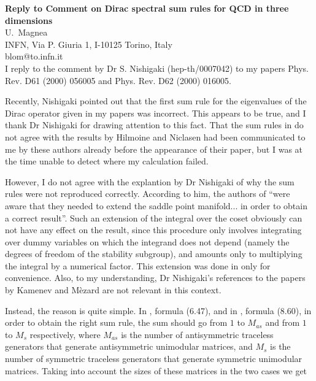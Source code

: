 \documentclass[a4paper,10pt]{article}
\begin{document}
\begin{center}
{\Large{\bf Reply to Comment on Dirac spectral sum rules for QCD 
in three dimensions
}}\\[2mm]

{
U.~Magnea \\
{\small INFN, Via P. Giuria 1, I-10125 Torino, Italy \\
blom@to.infn.it}
}\\[2mm]

{\small I reply to the comment by Dr S. Nishigaki (hep-th/0007042)
to my papers Phys. Rev. D61 (2000) 056005 and Phys. Rev. D62 (2000) 016005.
}
\end{center}

Recently, Nishigaki 
\cite{Comment} pointed out that the first sum rule for the
eigenvalues of the Dirac operator given in my papers \cite{QCD3_1,QCD3_2} 
was incorrect. This appears to be true, and I thank 
Dr Nishigaki for drawing attention to this fact. That the sum rules in 
\cite{QCD3_1,QCD3_2} do not agree with the results by Hilmoine and Niclasen 
\cite{ChrRu} had been communicated to me by these authors
already before the appearance of their paper, but I was at the time 
unable to detect where my calculation failed.

However, I do not agree with the explantion by Dr Nishigaki of why the
sum rules were not reproduced correctly.
According to him, the authors of \cite{V25}
``were aware that they needed to extend the saddle point manifold... 
in order to obtain a correct result''. Such an extension of the integral
over the coset obviously can not have any effect on the result, since
this procedure only involves integrating over dummy variables on which the
integrand does not depend (namely the degrees of freedom of the stability 
subgroup), and amounts only to multiplying the integral by a numerical
factor. This extension was done in \cite{V25} only for convenience. 
Also, to my understanding, Dr Nishigaki's references to the papers by Kamenev
and M{\`e}zard are not relevant in this context.

Instead, the reason is quite simple. In \cite{QCD3_1}, 
formula (6.47),
and in \cite{QCD3_2}, formula (8.60), in order to obtain the right sum rule, 
the sum should go from $1$ to $M_{as}$ and from $1$ to $M_{s}$ respectively,
where $M_{as}$ is the number of antisymmetric traceless generators that
generate antisymmetric unimodular matrices, and $M_s$ is the
number of symmetric traceless generators that generate symmetric 
unimodular matrices. Taking into account the sizes of these 
matrices in the two cases we get
\end{document}
